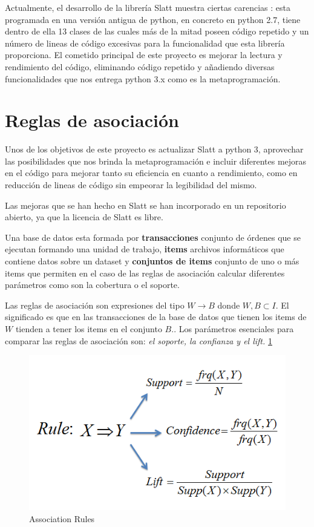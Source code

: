 \documentclass{cosas/tfg_domingo}
\begin{document}
Actualmente, el desarrollo de la librería Slatt muestra ciertas carencias : esta programada en una versión antigua de python, en concreto en python 2.7, tiene dentro de ella 13 clases de las cuales más de la mitad poseen código repetido y un número de lineas de código excesivas para la funcionalidad que esta librería proporciona.
El cometido principal de este proyecto es mejorar la lectura y rendimiento del código, eliminando código repetido y añadiendo diversas funcionalidades que nos entrega python 3.x como es la metaprogramación.

\section{Reglas de asociación}

Unos de los objetivos de este proyecto es actualizar Slatt a python 3, aprovechar las posibilidades que nos brinda la metaprogramación e incluir diferentes mejoras en el código para mejorar tanto su eficiencia en cuanto a rendimiento, como en reducción de lineas de código sin empeorar la legibilidad del mismo.

\hfill

Las mejoras que se han hecho en Slatt se han incorporado en un repositorio abierto, ya que la licencia de Slatt es libre.

\hfill

Una base de datos esta formada por \textbf{transacciones}  conjunto de órdenes que se ejecutan formando una unidad de trabajo, \textbf{items} archivos informáticos que contiene datos sobre un dataset  y \textbf{conjuntos de items} conjunto de uno o más items que permiten en el caso de las reglas de asociación calcular diferentes parámetros como son la cobertura o el soporte.


Las reglas de asociación son expresiones del tipo $W \rightarrow B$ donde $W, B \subset I$. El significado es que en las transacciones de la base de datos que tienen los items de $W$ tienden a tener los items en el conjunto $B$.. Los parámetros esenciales para comparar las reglas de asociación son: \textit{el soporte, la confianza y el lift.} \ref{asoc_rules}

\begin{figure}[ht!] %
\begin{center}
\includegraphics[width=.49\linewidth]{imagenes/AR_1.png}
\end{center}
\caption{Association Rules}
\label{asoc_rules}
\end{figure}
\end{document}
